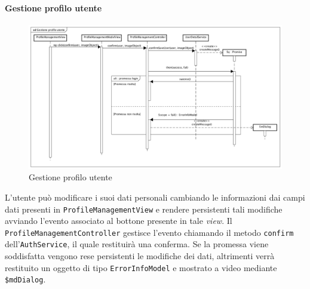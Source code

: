 \paragraph{Gestione profilo utente}

\label{Gestione profilo utente}

\begin{figure}[ht]
	\centering
	\includegraphics[scale=0.375,keepaspectratio]{UML/DiagrammiDiSequenza/Front-end/ProfileManagement.png}
	\caption{Gestione profilo utente}
\end{figure} \FloatBarrier

L'utente può modificare i suoi dati personali cambiando le informazioni dai campi dati presenti in \texttt{ProfileManagementView} e rendere persistenti tali modifiche avviando l'evento associato al bottone presente in tale \textit{view}. Il \texttt{ProfileManagementController} gestisce l'evento chiamando il metodo \texttt{confirm} dell'\texttt{AuthService}, il quale restituirà una conferma. Se la promessa viene soddisfatta vengono rese persistenti le modifiche dei dati, altrimenti  verrà restituito un oggetto di tipo \texttt{ErrorInfoModel} e mostrato a video mediante \texttt{\$mdDialog}. 